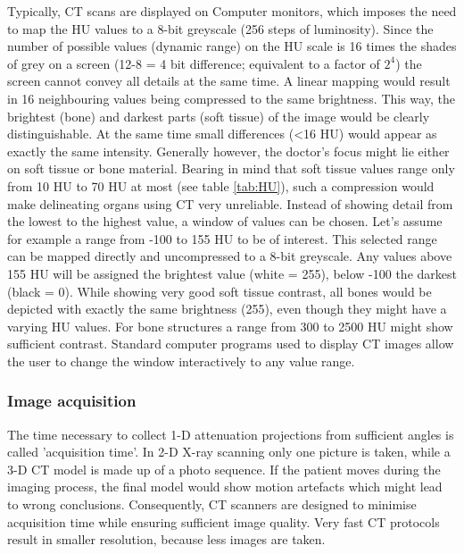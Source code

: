Typically, CT scans are displayed on Computer monitors, which imposes the need to map the HU values to a 8-bit greyscale (256 steps of luminosity).
Since the number of possible values (dynamic range) on the HU scale is 16 times the shades of grey on a screen (12-8 = 4 bit difference; equivalent to a factor of $2^4$) the screen cannot convey all details at the same time.
A linear mapping would result in 16 neighbouring values being compressed to the same brightness.
This way, the brightest (bone) and darkest parts (soft tissue) of the image would be clearly distinguishable.
At the same time small differences (<16 HU) would appear as exactly the same intensity.
Generally however, the doctor's focus might lie either on soft tissue or bone material.
Bearing in mind that soft tissue values range only from 10 HU to 70 HU at most (see table \ref{tab:HU}), such a compression would make delineating organs using CT very unreliable.
Instead of showing detail from the lowest to the highest value, a window of values can be chosen.
Let's assume for example a range from -100 to 155 HU to be of interest.
This selected range can be mapped directly and uncompressed to a 8-bit greyscale.
Any values above 155 HU will be assigned the brightest value (white = 255), below -100 the darkest (black = 0).
While showing very good soft tissue contrast, all bones would be depicted with exactly the same brightness (255), even though they might have a varying HU values.
For bone structures a range from 300 to 2500 HU might show sufficient contrast.
Standard computer programs used to display CT images allow the user to change the window interactively to any value range.

\subsubsection{Image acquisition}
The time necessary to collect 1-D attenuation projections from sufficient angles is called 'acquisition time'.
In 2-D X-ray scanning only one picture is taken, while a 3-D CT model is made up of a photo sequence.
If the patient moves during the imaging process, the final model would show motion artefacts which might lead to wrong conclusions.
Consequently, CT scanners are designed to minimise acquisition time while ensuring sufficient image quality.
Very fast CT protocols result in smaller resolution, because less images are taken.

